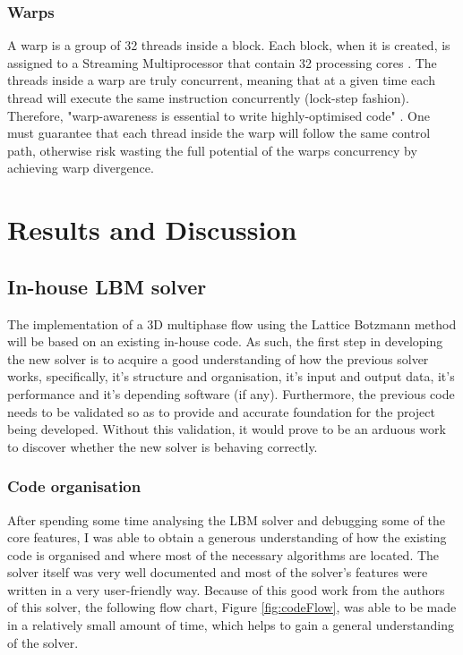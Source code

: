 \documentclass[12pt, openany]{book}
\begin{document}
\subsection{Warps}
A warp is a group of 32 threads inside a block. Each block, when it is created, is assigned to a Streaming Multiprocessor that contain 32 processing cores \cite{webinar1, webinar2}. The threads inside a warp are truly concurrent, meaning that at a given time each thread will execute the same instruction concurrently (lock-step fashion). Therefore, "warp-awareness is essential to write highly-optimised code" \cite{salvatore}. One must guarantee that each thread inside the warp will follow the same control path, otherwise risk wasting the full potential of the warps concurrency by achieving warp divergence.

\chapter{Results and Discussion}
\section{In-house LBM solver}
The implementation of a 3D multiphase flow using the Lattice Botzmann method will be based on an existing in-house code. As such, the first step in developing the new solver is to acquire a good understanding of how the previous solver works, specifically, it’s structure and organisation, it’s input and output data, it’s performance and it’s depending software (if any). Furthermore, the previous code needs to be validated so as to provide and accurate foundation for the project being developed. Without this validation, it would prove to be an arduous work to discover whether the new solver is behaving correctly.
\subsection{Code organisation}
After spending some time analysing the LBM solver and debugging some of the core features, I was able to obtain a generous understanding of how the existing code is organised and where most of the necessary algorithms are located. The solver itself was very well documented and most of the solver’s features were written in a very user-friendly way. Because of this good work from the authors of this solver, the following flow chart, Figure \ref{fig:codeFlow}, was able to be made in a relatively small amount of time, which helps to gain a general understanding of the solver.
\end{document}

